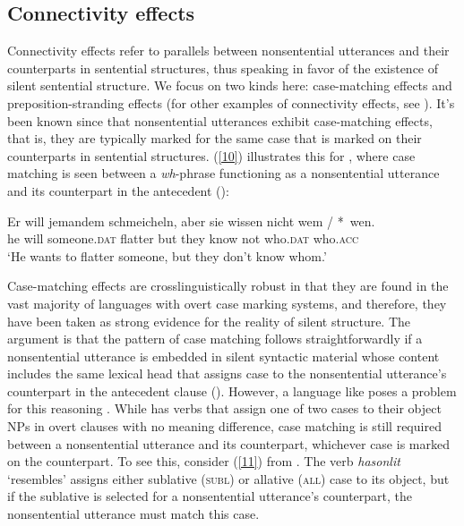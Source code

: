 \subsection{Connectivity effects}
\label{sec-connectivity-effects}

Connectivity effects refer to parallels between nonsentential utterances and their counterparts in sentential structures, thus speaking in favor of the existence of silent sentential structure. We focus on two kinds here: case-matching effects and preposition-stranding effects (for other examples of connectivity effects, see \citealt{Ginzburg2018}). It's been known since \citet{Ross1967} that nonsentential utterances exhibit case-matching effects, that is, they are typically marked for the same case that is marked on their counterparts in sentential structures. (\ref{10}) illustrates this for , where case matching is seen between a \emph{wh}-phrase functioning as a nonsentential utterance and its counterpart in the antecedent (\citealt[663]{Merchant2005-proc}):

\ea
\gll Er will jemandem schmeicheln, aber sie wissen nicht wem / *~wen.\\
     he will someone.\textsc{dat} flatter but they know not who.\textsc{dat} {}  \hphantom{*~}who.\textsc{acc}\\
\glt `He wants to flatter someone, but they don't know whom.'\label{10}\z


Case-matching effects are crosslinguistically robust in that they are found in the vast majority of languages with overt case marking systems, and therefore, they have been taken as strong evidence for the reality of silent structure. The argument is that the pattern of case matching follows straightforwardly if a nonsentential utterance is embedded in silent syntactic material whose content includes the same lexical head that assigns case to the nonsentential utterance's counterpart in the antecedent clause (\citealt{Merchant2001, Merchant2005a}). However, a language like  poses a problem for this reasoning \citep{Jacobson2016}. While  has verbs that assign one of two cases to their object NPs in overt clauses with no meaning difference, case matching is still required between a nonsentential utterance and its counterpart, whichever case is marked on the counterpart. To see this, consider (\ref{11}) from \citet[356]{Jacobson2016}. The verb \emph{hasonlit} `resembles' assigns either sublative (\textsc{subl}) or allative (\textsc{all}) case to its object, but if  the sublative is selected for a nonsentential utterance's counterpart, the nonsentential utterance  must match this case.

